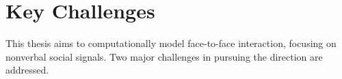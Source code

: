%


\section{Key Challenges}
This thesis aims to computationally model face-to-face interaction, focusing on nonverbal social signals. Two major challenges in pursuing the direction are addressed.
